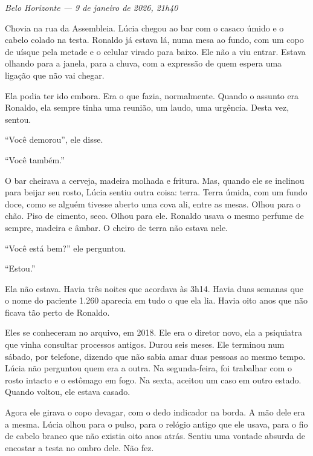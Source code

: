 
\noindent \textit{Belo Horizonte --- 9 de janeiro de 2026, 21h40}

\noindent Chovia na rua da Assembleia. Lúcia chegou ao bar com o casaco úmido e o cabelo colado na testa. Ronaldo já estava lá, numa mesa ao fundo, com um copo de uísque pela metade e o celular virado para baixo. Ele não a viu entrar. Estava olhando para a janela, para a chuva, com a expressão de quem espera uma ligação que não vai chegar.

\noindent Ela podia ter ido embora. Era o que fazia, normalmente. Quando o assunto era Ronaldo, ela sempre tinha uma reunião, um laudo, uma urgência. Desta vez, sentou.

\noindent ``Você demorou'', ele disse.

\noindent ``Você também.''

\noindent O bar cheirava a cerveja, madeira molhada e fritura. Mas, quando ele se inclinou para beijar seu rosto, Lúcia sentiu outra coisa: terra. Terra úmida, com um fundo doce, como se alguém tivesse aberto uma cova ali, entre as mesas. Olhou para o chão. Piso de cimento, seco. Olhou para ele. Ronaldo usava o mesmo perfume de sempre, madeira e âmbar. O cheiro de terra não estava nele.

\noindent ``Você está bem?'' ele perguntou.

\noindent ``Estou.''

\noindent Ela não estava. Havia três noites que acordava às 3h14. Havia duas semanas que o nome do paciente 1.260 aparecia em tudo o que ela lia. Havia oito anos que não ficava tão perto de Ronaldo.

\noindent Eles se conheceram no arquivo, em 2018. Ele era o diretor novo, ela a psiquiatra que vinha consultar processos antigos. Durou seis meses. Ele terminou num sábado, por telefone, dizendo que não sabia amar duas pessoas ao mesmo tempo. Lúcia não perguntou quem era a outra. Na segunda-feira, foi trabalhar com o rosto intacto e o estômago em fogo. Na sexta, aceitou um caso em outro estado. Quando voltou, ele estava casado.

\noindent Agora ele girava o copo devagar, com o dedo indicador na borda. A mão dele era a mesma. Lúcia olhou para o pulso, para o relógio antigo que ele usava, para o fio de cabelo branco que não existia oito anos atrás. Sentiu uma vontade absurda de encostar a testa no ombro dele. Não fez.

